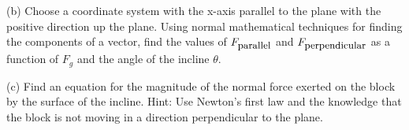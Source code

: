 (b) Choose a coordinate system with the x-axis parallel to the plane with the
positive direction up the plane. Using normal mathematical techniques for finding the components of a vector, find the values of 
\( F_{\mbox{\small parallel}} \) and \( F_{\mbox{\small perpendicular}} \)
as a function of \( F_{g} \) and the angle of the incline \( \theta  \).
\vspace{20mm}

(c) Find an equation for the magnitude of the normal force exerted on the
block by the surface of the incline. Hint: Use Newton's first law and the knowledge that the block is not moving in a direction perpendicular to the plane.

